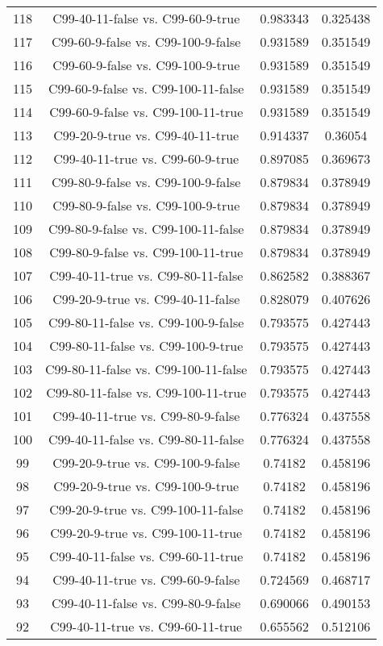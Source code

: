 \documentclass[a4paper,10pt]{article}
\begin{document}
\begin{landscape}
\begin{table}[!htp]
\begin{tabular}{cccc}
118&C99-40-11-false vs. C99-60-9-true&0.983343&0.325438\\
117&C99-60-9-false vs. C99-100-9-false&0.931589&0.351549\\
116&C99-60-9-false vs. C99-100-9-true&0.931589&0.351549\\
115&C99-60-9-false vs. C99-100-11-false&0.931589&0.351549\\
114&C99-60-9-false vs. C99-100-11-true&0.931589&0.351549\\
113&C99-20-9-true vs. C99-40-11-true&0.914337&0.36054\\
112&C99-40-11-true vs. C99-60-9-true&0.897085&0.369673\\
111&C99-80-9-false vs. C99-100-9-false&0.879834&0.378949\\
110&C99-80-9-false vs. C99-100-9-true&0.879834&0.378949\\
109&C99-80-9-false vs. C99-100-11-false&0.879834&0.378949\\
108&C99-80-9-false vs. C99-100-11-true&0.879834&0.378949\\
107&C99-40-11-true vs. C99-80-11-false&0.862582&0.388367\\
106&C99-20-9-true vs. C99-40-11-false&0.828079&0.407626\\
105&C99-80-11-false vs. C99-100-9-false&0.793575&0.427443\\
104&C99-80-11-false vs. C99-100-9-true&0.793575&0.427443\\
103&C99-80-11-false vs. C99-100-11-false&0.793575&0.427443\\
102&C99-80-11-false vs. C99-100-11-true&0.793575&0.427443\\
101&C99-40-11-true vs. C99-80-9-false&0.776324&0.437558\\
100&C99-40-11-false vs. C99-80-11-false&0.776324&0.437558\\
99&C99-20-9-true vs. C99-100-9-false&0.74182&0.458196\\
98&C99-20-9-true vs. C99-100-9-true&0.74182&0.458196\\
97&C99-20-9-true vs. C99-100-11-false&0.74182&0.458196\\
96&C99-20-9-true vs. C99-100-11-true&0.74182&0.458196\\
95&C99-40-11-false vs. C99-60-11-true&0.74182&0.458196\\
94&C99-40-11-true vs. C99-60-9-false&0.724569&0.468717\\
93&C99-40-11-false vs. C99-80-9-false&0.690066&0.490153\\
92&C99-40-11-true vs. C99-60-11-true&0.655562&0.512106\\

\end{tabular}
\end{table}
\end{landscape}
\end{document}
